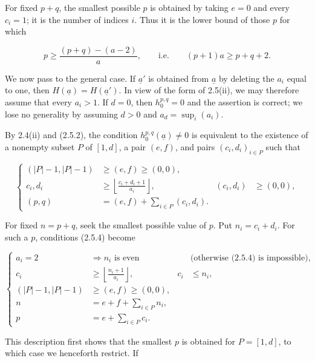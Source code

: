 For fixed $p+q$, the smallest possible $p$ is obtained by taking $e=0$
and every $c_i=1$; it is the number of indices $i$.  Thus it is the lower
bound of those $p$ for which

\begin{equation*}
p\geq\frac{(p+q)-(a-2)}{a},
\qquad\text{i.e.}\qquad (p+1)a\geq p+q+2.
\end{equation*}

We now pass to the general case.  If $\underline a'$ is obtained from
$\underline a$ by deleting the $a_i$ equal to one, then
$H(\underline a)=H(\underline a')$.  In view of the form of 2.5(ii), we may
therefore assume that every $a_i>1$.  If $d=0$, then
$h_0^{p,q}=0$ and the assertion is correct; we lose no generality by
assuming $d>0$ and $a_d=\sup_i(a_i)$.

By 2.4(ii) and (2.5.2), the condition
$h_0^{p,q}(\underline a)\ne0$ is equivalent to the existence of a nonempty
subset $P$ of $[1,d]$, a pair $(e,f)$, and pairs
$(c_i,d_i)_{i\in P}$ such that

\begin{equation}\tag{2.5.4}
\left\{
\begin{aligned}
(|P|-1,|P|-1)&\geq(e,f)\geq(0,0),\\
c_i,d_i&\geq
\left\lfloor\frac{c_i+d_i+1}{a_i}\right\rfloor,
& (c_i,d_i)&\geq(0,0),\\
(p,q)&=(e,f)+\sum_{i\in P}(c_i,d_i).&&
\end{aligned}
\right.
\end{equation}

For fixed $n=p+q$, seek the smallest possible value of $p$.  Put
$n_i=c_i+d_i$.  For such a $p$, conditions (2.5.4) become


\begin{equation}\tag{2.5.5}
\left\{
\begin{aligned}
a_i=2&\Longrightarrow n_i\text{ is even}
&&\text{(otherwise (2.5.4) is impossible)},\\
c_i&\geq\left\lfloor\frac{n_i+1}{a_i}\right\rfloor,
&c_i&\leq n_i,\\
(|P|-1,|P|-1)&\geq(e,f)\geq(0,0),&&\\
n&=e+f+\sum_{i\in P}n_i,&&\\
p&=e+\sum_{i\in P}c_i.&&
\end{aligned}
\right.
\end{equation}

This description first shows that the smallest $p$ is obtained for
$P=[1,d]$, to which case we henceforth restrict.  If


